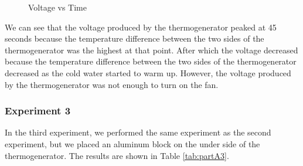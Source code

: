 \documentclass[a4paper, 12pt, english]{article}
\begin{document}
\begin{figure}[H]
	\centering
	\caption{Voltage vs Time}
	\label{fig:a2}
\end{figure}
We can see that the voltage produced by the thermogenerator peaked at 45
seconds because the temperature difference between the two sides of the
thermogenerator was the highest at that point. After which the voltage
decreased because the temperature difference between the two sides of the
thermogenerator decreased as the cold water started to warm up. However,
the voltage produced by the thermogenerator was not enough to turn on the fan.

\subsubsection{Experiment 3}
In the third experiment, we performed the same experiment as the second
experiment, but we placed an aluminum block on the under side of the
thermogenerator. The results are shown in Table \ref{tab:partA3}.
\end{document}
